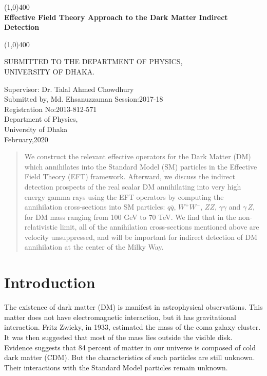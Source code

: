 \documentclass[12pt]{report}
\begin{document}
\begin{titlepage}
\begin{center}
\vspace*{1cm}
\large{}

\vfill
\line(1,0){400}\\

\Huge{\textbf{Effective Field Theory Approach to the Dark Matter Indirect Detection}}

\line(1,0){400}\\

\vfill

SUBMITTED TO THE DEPARTMENT OF PHYSICS,\\ UNIVERSITY OF DHAKA.


\newpage

Supervisor: Dr. Talal Ahmed Chowdhury\\
Submitted by,
Md. Ehsanuzzaman
Session:2017-18   \\
Registration No:2013-812-571\\ 
Department of Physics,\\
University of Dhaka\\
February,2020\\
\end{center}
\end{titlepage}

\tableofcontents
\thispagestyle{empty}
\clearpage

\setcounter{page}{1}

\begin{abstract}
We construct the relevant effective operators for the Dark Matter (DM)  which annihilates into the Standard Model (SM) particles in the Effective Field Theory (EFT) framework. Afterward, we discuss the indirect detection prospects of the real scalar DM annihilating into very high energy gamma rays using the EFT operators by computing the annihilation cross-sections into SM particles: $q\overline{q}$, $W^{+}W^{-}$, $ZZ$, $\gamma\gamma$ and $\gamma\, Z$, for DM mass ranging from 100 GeV to 70 TeV. We find that in the non-relativistic limit, all of the annihilation cross-sections mentioned above are velocity unsuppressed, and will be important for indirect detection of DM annihilation at the center of the Milky Way.
\end{abstract}

\chapter{Introduction}
The existence of dark matter (DM) is manifest in astrophysical observations. This matter does not have electromagnetic interaction, but it has gravitational interaction. Fritz Zwicky, in 1933, estimated the mass of the coma galaxy cluster. It was then suggested that most of the mass lies outside the visible disk. Evidence suggests that 84 percent of matter in our universe is composed of cold dark matter (CDM). But the characteristics of such particles are still unknown. Their interactions with the Standard Model particles remain unknown.\\
\end{document}

